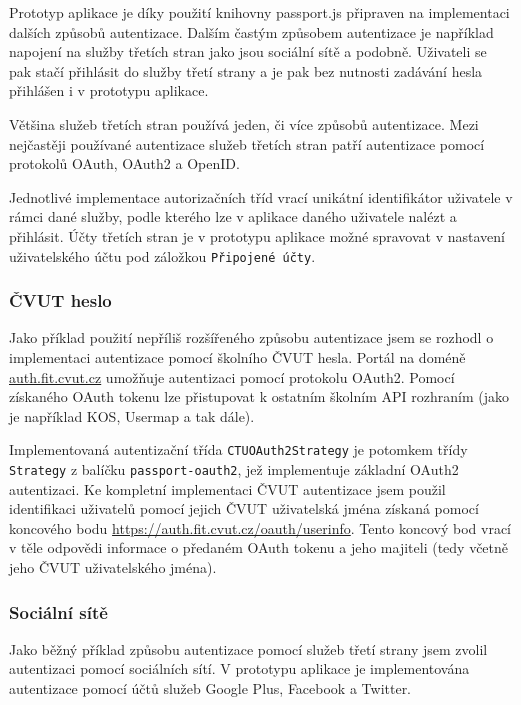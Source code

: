 Prototyp aplikace je díky použití knihovny passport.js připraven na implementaci dalších způsobů autentizace.
Dalším častým způsobem autentizace je například napojení na služby třetích stran jako jsou sociální sítě a podobně.
Uživateli se pak stačí přihlásit do služby třetí strany a je pak bez nutnosti zadávání hesla přihlášen i v prototypu aplikace.

Většina služeb třetích stran používá jeden, či více způsobů autentizace.
Mezi nejčastěji používané autentizace služeb třetích stran patří autentizace pomocí protokolů OAuth, OAuth2 a OpenID.

\pagebreak

Jednotlivé implementace autorizačních tříd vrací unikátní identifikátor uživatele v rámci dané služby, podle kterého lze v aplikace daného uživatele nalézt a přihlásit.
Účty třetích stran je v prototypu aplikace možné spravovat v nastavení uživatelského účtu pod záložkou \texttt{Připojené účty}.

\subsubsection{ČVUT heslo}

Jako příklad použití nepříliš rozšířeného způsobu autentizace jsem se rozhodl o implementaci autentizace pomocí školního \acrshort{ČVUT} hesla.
Portál na doméně \href{https://auth.fit.cvut.cz/manager}{auth.fit.cvut.cz} umožňuje autentizaci pomocí protokolu OAuth2.
Pomocí získaného OAuth tokenu lze přistupovat k ostatním školním \gls{API} rozhraním (jako je například KOS, Usermap a tak dále).

Implementovaná autentizační třída \texttt{CTUOAuth2Strategy} je potomkem třídy \texttt{Strategy} z balíčku \texttt{passport-oauth2}, jež implementuje základní OAuth2 autentizaci.
Ke kompletní implementaci \acrshort{ČVUT} autentizace jsem použil identifikaci uživatelů pomocí jejich \acrshort{ČVUT} uživatelská jména získaná pomocí koncového bodu \url{https://auth.fit.cvut.cz/oauth/userinfo}.
Tento koncový bod vrací v těle odpovědi informace o předaném OAuth tokenu a jeho majiteli (tedy včetně jeho \acrshort{ČVUT} uživatelského jména).

\subsubsection{Sociální sítě}

Jako běžný příklad způsobu autentizace pomocí služeb třetí strany jsem zvolil autentizaci pomocí sociálních sítí.
V prototypu aplikace je implementována autentizace pomocí účtů služeb Google Plus, Facebook a Twitter.

